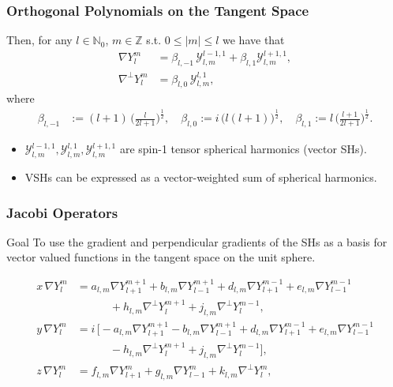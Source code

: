 \documentclass[10pt]{beamer}
\newcommand{\half}{\frac{1}{2}}
\newcommand{\Z}{\mathbb{Z}}
\newcommand{\No}{\mathbb{N}_0}
\newcommand{\Ylm}{Y^m_l}
\newcommand{\gradY}{\nabla Y}
\newcommand{\gradYlm}{\nabla Y^m_l}
\newcommand{\gradpY}{\nabla^\perp Y}
\newcommand{\curlyy}{\bm{\mathcal{Y}}}
\newcommand{\blone}{\beta_{l, 1}}
\newcommand{\blzero}{\beta_{l, 0}}
\newcommand{\blmone}{\beta_{l, -1}}
\newcommand{\alm}{a_{l,m}}
\newcommand{\blm}{b_{l,m}}
\newcommand{\dlm}{d_{l,m}}
\newcommand{\elm}{e_{l,m}}
\newcommand{\flm}{f_{l,m}}
\newcommand{\glm}{g_{l,m}}
\newcommand{\hlm}{h_{l,m}}
\newcommand{\jlm}{j_{l,m}}
\newcommand{\klm}{k_{l,m}}
\begin{document}
\frame
{
    \frametitle{Orthogonal Polynomials on the Tangent Space}

Then, for any \(l \in \No\), \(m \in \Z\) s.t. \(0 \le |m| \le l\) we have that
\begin{align}
\nabla \Ylm &= \blmone \, \curlyy^{l-1,1}_{l,m} + \blone \curlyy^{l+1,1}_{l,m}, \\
\nabla^\perp \Ylm &= \blzero \, \curlyy^{l,1}_{l,m},
\end{align}
where
\begin{align}
\blmone &:= (l+1) \, \Big(\frac{l}{2l+1}\Big)^\half, \quad
\blzero := i \, \big(l(l+1)\big)^\half, \quad
\blone := l \, \Big(\frac{l+1}{2l+1}\Big)^\half.
\end{align}

\begin{itemize}
\item $\curlyy^{l-1,1}_{l,m}, \curlyy^{l,1}_{l,m}, \curlyy^{l+1,1}_{l,m}$ are spin-1 tensor spherical harmonics (vector SHs).
\item VSHs can be expressed as a vector-weighted sum of spherical harmonics.
\end{itemize}

}

\frame
{
    \frametitle{Jacobi Operators}
    
\begin{block}{Goal}
To use the gradient and perpendicular gradients of the SHs as a basis for vector valued functions in the tangent space on the unit sphere.
\end{block}

\begin{align}
x \,\gradYlm &= \alm \gradY^{m+1}_{l+1} + \blm \gradY^{m+1}_{l-1} + \dlm \gradY^{m-1}_{l+1} + \elm \gradY^{m-1}_{l-1} \nonumber \\
& \quad \quad \quad + \hlm \gradpY^{m+1}_{l} + \jlm \gradpY^{m-1}_{l}, \\
y \,\gradYlm &= i \, \Big[ -\alm \gradY^{m+1}_{l+1} - \blm \gradY^{m+1}_{l-1} + \dlm \gradY^{m-1}_{l+1} + \elm \gradY^{m-1}_{l-1} \nonumber \\
& \quad \quad \quad - \hlm \gradpY^{m+1}_{l} + \jlm \gradpY^{m-1}_{l} \Big], \\
z \,\gradYlm &= \flm \gradY^{m}_{l+1} + \glm \gradY^{m}_{l-1} + \klm \gradpY^{m}_{l},
\end{align}
    
}
\end{document}
